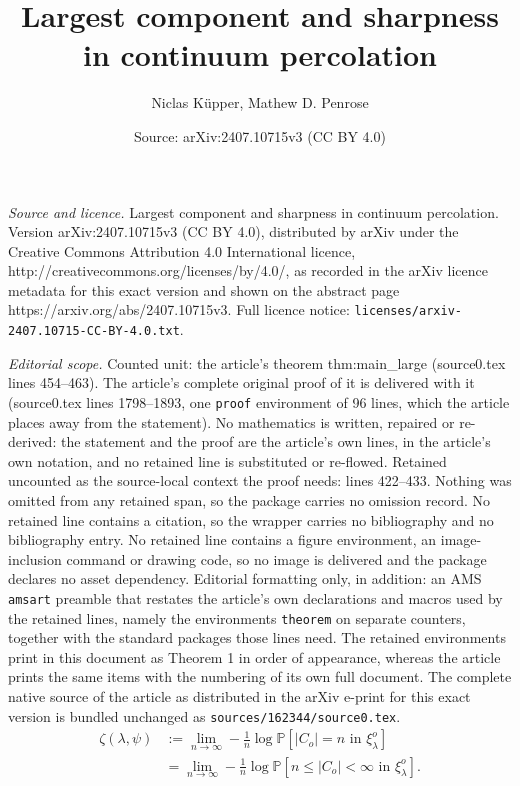 \documentclass[10pt,a4paper]{amsart}
\title{Largest component and sharpness in continuum percolation}
\author{Niclas K\"upper, Mathew D. Penrose}
\date{Source: arXiv:2407.10715v3 (CC BY 4.0)}
\renewcommand{\P}{\mathbb{P}}
\newcommand{\conn}{\psi}
\begin{document}
\maketitle

\noindent\emph{Source and licence.} Largest component and sharpness in continuum percolation. Version arXiv:2407.10715v3 (CC BY 4.0), distributed by arXiv under the Creative Commons Attribution 4.0 International licence, http://creativecommons.org/licenses/by/4.0/, as recorded in the arXiv licence metadata for this exact version and shown on the abstract page https://arxiv.org/abs/2407.10715v3. Full licence notice: \texttt{licenses/arxiv-2407.10715-CC-BY-4.0.txt}.\par\smallskip

\noindent\textit{Editorial scope.} Counted unit: the article's theorem thm:main\_large (source0.tex lines 454--463). The article's complete original proof of it is delivered with it (source0.tex lines 1798--1893, one \texttt{proof} environment of 96 lines, which the article places away from the statement). No mathematics is written, repaired or re-derived: the statement and the proof are the article's own lines, in the article's own notation, and no retained line is substituted or re-flowed.  Retained uncounted as the source-local context the proof needs: lines 422--433.  Nothing was omitted from any retained span, so the package carries no omission record.  No retained line contains a citation, so the wrapper carries no bibliography and no bibliography entry.  No retained line contains a figure environment, an image-inclusion command or drawing code, so no image is delivered and the package declares no asset dependency.  Editorial formatting only, in addition: an AMS \texttt{amsart} preamble that restates the article's own declarations and macros used by the retained lines, namely the environments \texttt{theorem} on separate counters, together with the standard packages those lines need.  The retained environments print in this document as Theorem 1 in order of appearance, whereas the article prints the same items with the numbering of its own full document.  The complete native source of the article as distributed in the arXiv e-print for this exact version is bundled unchanged as \texttt{sources/162344/source0.tex}.
  \begin{align}
    \zeta(\lambda, \conn)
    & :=
    \lim_{n\to\infty}
    -\frac1n \log \P[|C_o|= n\text{ in }\xi_{\lambda}^o] \label{eq:def-cor-1}
    \\
    & =
    \lim_{n\to\infty}
    -\frac1n \log \P[
      n\leq|C_o|< \infty \text{ in }\xi_{\lambda}^o \label{eq:def-cor-2}
    ].
  \end{align}
\end{document}
